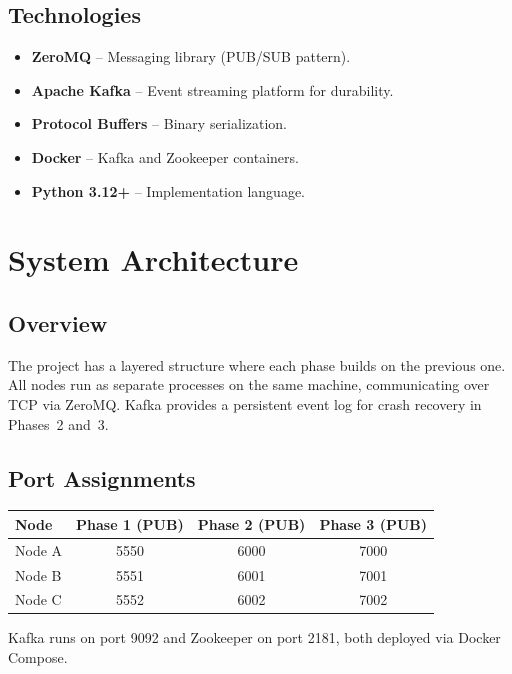 \documentclass[12pt, a4paper]{article}
\begin{document}
\subsection{Technologies}

\begin{itemize}
    \item \textbf{ZeroMQ} -- Messaging library (PUB/SUB pattern).
    \item \textbf{Apache Kafka} -- Event streaming platform for durability.
    \item \textbf{Protocol Buffers} -- Binary serialization.
    \item \textbf{Docker} -- Kafka and Zookeeper containers.
    \item \textbf{Python 3.12+} -- Implementation language.
\end{itemize}

\section{System Architecture}

\subsection{Overview}

The project has a layered structure where each phase builds on the previous one. All nodes run as separate processes on the same machine, communicating over TCP via ZeroMQ. Kafka provides a persistent event log for crash recovery in Phases~2 and~3.

\subsection{Port Assignments}

\begin{table}[ht]
\centering
\begin{tabular}{lccc}
\toprule
\textbf{Node} & \textbf{Phase 1 (PUB)} & \textbf{Phase 2 (PUB)} & \textbf{Phase 3 (PUB)} \\
\midrule
Node A & 5550 & 6000 & 7000 \\
Node B & 5551 & 6001 & 7001 \\
Node C & 5552 & 6002 & 7002 \\
\bottomrule
\end{tabular}
\end{table}

Kafka runs on port 9092 and Zookeeper on port 2181, both deployed via Docker Compose.
\end{document}
